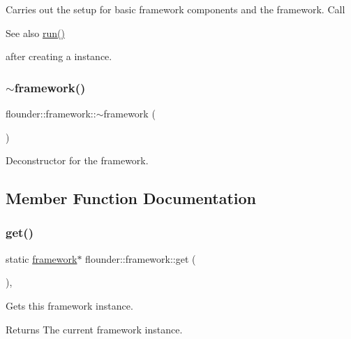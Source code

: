 Carries out the setup for basic framework components and the framework. Call \begin{DoxySeeAlso}{See also}
\hyperlink{classflounder_1_1framework_aa3a73c8e8f5f0c6ccef3e4de89982434}{run()}


\end{DoxySeeAlso}
after creating a instance. 

\mbox{\label{classflounder_1_1framework_a4f5440b66d1c2e7e35d9dc7fd733f944}} 
\subsubsection{\texorpdfstring{$\sim$framework()}{~framework()}}
{\footnotesize\ttfamily flounder\+::framework\+::$\sim$framework (\begin{DoxyParamCaption}{ }\end{DoxyParamCaption})}



Deconstructor for the framework. 



\subsection{Member Function Documentation}
\mbox{\label{classflounder_1_1framework_a1b1dbf1058cc4589b090326baf1beb87}} 
\subsubsection{\texorpdfstring{get()}{get()}}
{\footnotesize\ttfamily static \hyperlink{classflounder_1_1framework}{framework}$\ast$ flounder\+::framework\+::get (\begin{DoxyParamCaption}{ }\end{DoxyParamCaption})\hspace{0.3cm}{\ttfamily [inline]}, {\ttfamily [static]}}



Gets this framework instance. 

\begin{DoxyReturn}{Returns}
The current framework instance. 
\end{DoxyReturn}
\mbox{\label{classflounder_1_1framework_a46219c3eae921c9819e7228ec2d8d904}} 
